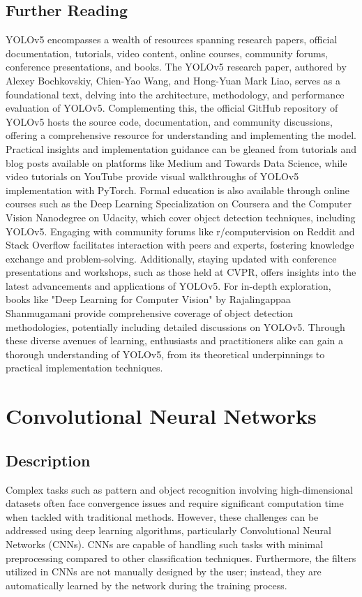 \subsection{Further Reading}
YOLOv5 encompasses a wealth of resources spanning research papers, official documentation, tutorials, video content, online courses, community forums, conference presentations, and books. The YOLOv5 research paper, authored by Alexey Bochkovskiy, Chien-Yao Wang, and Hong-Yuan Mark Liao, serves as a foundational text, delving into the architecture, methodology, and performance evaluation of YOLOv5. Complementing this, the official GitHub repository of YOLOv5 hosts the source code, documentation, and community discussions, offering a comprehensive resource for understanding and implementing the model.
Practical insights and implementation guidance can be gleaned from tutorials and blog posts available on platforms like Medium and Towards Data Science, while video tutorials on YouTube provide visual walkthroughs of YOLOv5 implementation with PyTorch. Formal education is also available through online courses such as the Deep Learning Specialization on Coursera and the Computer Vision Nanodegree on Udacity, which cover object detection techniques, including YOLOv5. Engaging with community forums like r/computervision on Reddit and Stack Overflow facilitates interaction with peers and experts, fostering knowledge exchange and problem-solving. Additionally, staying updated with conference presentations and workshops, such as those held at CVPR, offers insights into the latest advancements and applications of YOLOv5. For in-depth exploration, books like "Deep Learning for Computer Vision" by Rajalingappaa Shanmugamani provide comprehensive coverage of object detection methodologies, potentially including detailed discussions on YOLOv5. Through these diverse avenues of learning, enthusiasts and practitioners alike can gain a thorough understanding of YOLOv5, from its theoretical underpinnings to practical implementation techniques.

\section{Convolutional Neural Networks}

\subsection{Description}

Complex tasks such as pattern and object recognition involving high-dimensional datasets often face convergence issues and require significant computation time when tackled with traditional methods. However, these challenges can be addressed using deep learning algorithms, particularly Convolutional Neural Networks (CNNs). CNNs are capable of handling such tasks with minimal preprocessing compared to other classification techniques. Furthermore, the filters utilized in CNNs are not manually designed by the user; instead, they are automatically learned by the network during the training process. \cite{Saha:2018}

